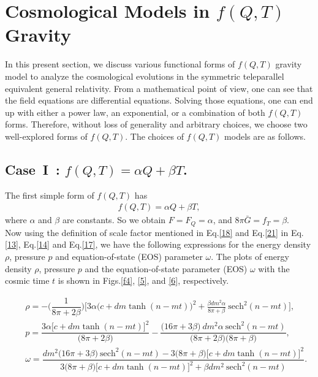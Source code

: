\documentclass[aps,prd,showpacs,nofootinbib,floats,floatfix,preprintnumbers,groupedaddress,twocolumn]{revtex4-1}
\def \a{\alpha}
\def \b{\beta}
\def \ben{\begin{eqnarray}}
\def \een{\end{eqnarray}}
\def \o{\omega}
\def \r{\rho}
\begin{document}
    
\section{Cosmological Models in $f(Q,T)$ Gravity}\label{V}
\noindent
    In this present section, we discuss various functional forms of $f(Q,T)$ gravity model to analyze the cosmological evolutions in the symmetric teleparallel equivalent general relativity. From a mathematical point of view, one can see that the field equations are differential equations. Solving those equations, one can end up with either a power law, an exponential, or a combination of both $f(Q,T)$ forms. Therefore, without loss of generality and arbitrary choices, we choose two well-explored forms of $f(Q,T)$. The choices of $f(Q,T)$ models are as follows.




\subsection{Case~I~: $f(Q,T)=\a Q+\b T$.}
    The first simple form of $f(Q,T)$ has 
\ben
    f(Q,T)=\a Q+\b T,\label{21}
\een
    where $\a$ and $\b$ are constants. So we obtain $F=F_Q=\a$, and $8\pi\bar{G}=f_T=\b$.
\\
    Now using the definition of scale factor mentioned in Eq.\eqref{18} and Eq.\eqref{21} in Eq.\eqref{13}, Eq.\eqref{14} and Eq.\eqref{17}, we have the following expressions for the energy density $\r$, pressure $p$ and equation-of-state (EOS) parameter $\o$. The plots of energy density $\r$, pressure $p$ and the equation-of-state parameter (EOS) $\o$ with the cosmic time $t$ is shown in Figs.\ref{f4}, \ref{5}, and \ref{6}, respectively.\\

\begin{widetext}
\ben
    &&\r=-\Big(\dfrac{1}{8\pi +2\b}\Big)\Big[3\a\big(c+dm\tanh(n-mt)\big)^2+\frac{\b d m^2\a}{8\pi +\b}~\text{sech}^2(n-mt)\Big],\label{22}
\\
    &&p=\dfrac{3\a\big[c+dm\tanh(n-mt)\big]^2}{\big(8\pi +2\b\big)}-\dfrac{\big(16\pi +3\b\big)~dm^2\a~\text{sech}^2(n-mt)}{\big(8\pi +2\b\big)\big(8\pi +\b\big)},\label{23}
\\
    &&\o=\dfrac{dm^2\big(16\pi+3\b\big)~\text{sech}^2(n-mt)-3\big(8\pi+\b\big)\big[c+dm\tanh(n-mt)\big]^2}{3\big(8\pi+\b\big)\big[c+dm\tanh(n-mt)\big]^2+\b dm^2~\text{sech}^2(n-mt)}.\label{24}
\een
\end{widetext}
\end{document}
